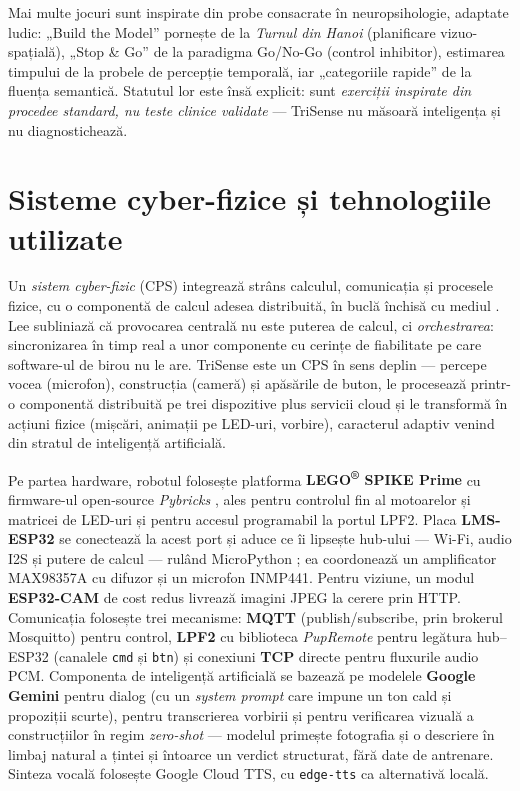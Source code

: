 Mai multe jocuri sunt inspirate din probe consacrate în neuropsihologie, adaptate ludic: „Build the Model” pornește de la \emph{Turnul din Hanoi} (planificare vizuo-spațială), „Stop \& Go” de la paradigma Go/No-Go (control inhibitor), estimarea timpului de la probele de percepție temporală, iar „categoriile rapide” de la fluența semantică. Statutul lor este însă explicit: sunt \emph{exerciții inspirate din procedee standard, nu teste clinice validate} — TriSense nu măsoară inteligența și nu diagnostichează.

\section{Sisteme cyber-fizice și tehnologiile utilizate}

Un \emph{sistem cyber-fizic} (CPS) integrează strâns calculul, comunicația și procesele fizice, cu o componentă de calcul adesea distribuită, în buclă închisă cu mediul \cite{lee2008}. Lee subliniază că provocarea centrală nu este puterea de calcul, ci \emph{orchestrarea}: sincronizarea în timp real a unor componente cu cerințe de fiabilitate pe care software-ul de birou nu le are. TriSense este un CPS în sens deplin — percepe vocea (microfon), construcția (cameră) și apăsările de buton, le procesează printr-o componentă distribuită pe trei dispozitive plus servicii cloud și le transformă în acțiuni fizice (mișcări, animații pe LED-uri, vorbire), caracterul adaptiv venind din stratul de inteligență artificială.

Pe partea hardware, robotul folosește platforma \textbf{LEGO\textsuperscript{®} SPIKE\texttrademark{} Prime} cu firmware-ul open-source \emph{Pybricks} \cite{pybricks}, ales pentru controlul fin al motoarelor și matricei de LED-uri și pentru accesul programabil la portul LPF2. Placa \textbf{LMS-ESP32} \cite{antonsmindstorms} se conectează la acest port și aduce ce îi lipsește hub-ului — Wi-Fi, audio I2S și putere de calcul — rulând MicroPython \cite{micropython}; ea coordonează un amplificator MAX98357A cu difuzor și un microfon INMP441. Pentru viziune, un modul \textbf{ESP32-CAM} de cost redus livrează imagini JPEG la cerere prin HTTP. Comunicația folosește trei mecanisme: \textbf{MQTT} \cite{mqtt} (publish/subscribe, prin brokerul Mosquitto) pentru control, \textbf{LPF2} cu biblioteca \emph{PupRemote} \cite{pupremote} pentru legătura hub--ESP32 (canalele \texttt{cmd} și \texttt{btn}) și conexiuni \textbf{TCP} directe pentru fluxurile audio PCM. Componenta de inteligență artificială se bazează pe modelele \textbf{Google Gemini} \cite{gemini} pentru dialog (cu un \emph{system prompt} care impune un ton cald și propoziții scurte), pentru transcrierea vorbirii și pentru verificarea vizuală a construcțiilor în regim \emph{zero-shot} — modelul primește fotografia și o descriere în limbaj natural a țintei și întoarce un verdict structurat, fără date de antrenare. Sinteza vocală folosește Google Cloud TTS, cu \texttt{edge-tts} ca alternativă locală.
